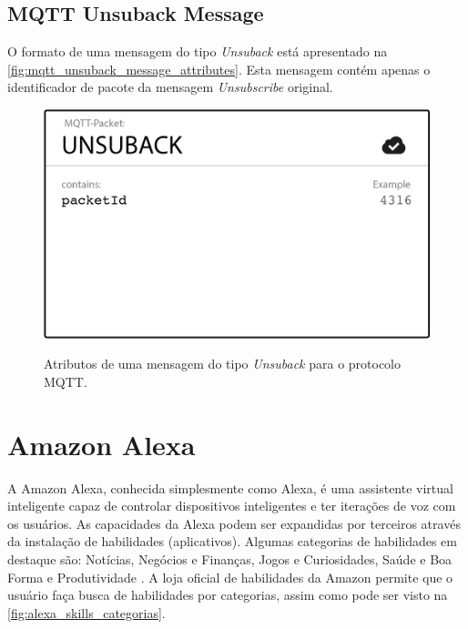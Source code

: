 \subsection{MQTT Unsuback Message}\label{subsection:mqtt_unsuback_message}

O formato de uma mensagem do tipo \textit{Unsuback} está apresentado na \autoref{fig:mqtt_unsuback_message_attributes}. Esta mensagem contém apenas o identificador de pacote da mensagem \textit{Unsubscribe} original.

\begin{figure}[htbp]
    \centering
    \caption{Atributos de uma mensagem do tipo \textit{Unsuback} para o protocolo MQTT.}
    \includegraphics[scale=0.5]{Imagens/mqtt_unsuback_message_attributes.png}
    \label{fig:mqtt_unsuback_message_attributes}
\end{figure}

\section{Amazon Alexa}\label{section:amazon_alexa}

A Amazon Alexa, conhecida simplesmente como Alexa, é uma assistente virtual inteligente capaz de controlar dispositivos inteligentes e ter iterações de voz com os usuários. As capacidades da Alexa podem ser expandidas por terceiros através da instalação de habilidades (aplicativos). Algumas categorias de habilidades em destaque são: Notícias, Negócios e Finanças, Jogos e Curiosidades, Saúde e Boa Forma e Produtividade \cite{ref:002}. A loja oficial de habilidades da Amazon permite que o usuário faça busca de habilidades por categorias, assim como pode ser visto na \autoref{fig:alexa_skills_categorias}.

